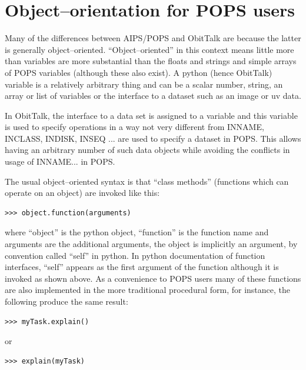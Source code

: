 \documentclass[11pt]{report}
\begin{document}
\section {Object--orientation for POPS users}
Many of the differences between AIPS/POPS and ObitTalk are because the
latter is generally object--oriented.
``Object--oriented'' in this context means little more than variables
are more substantial than the floats and strings and simple arrays of
POPS variables (although these also exist).
A python (hence ObitTalk) variable is a relatively arbitrary thing and
can be a scalar number, string, an array or list of variables or the
interface to a dataset such as an image or uv data.

In ObitTalk, the interface to a  data set is assigned to a variable and
this variable is used to specify operations in a way not very
different from INNAME, INCLASS, INDISK, INSEQ ... are used to specify
a dataset in POPS.
This allows having an arbitrary number of such data objects while
avoiding the conflicts in usage of INNAME... in POPS.

The usual object--oriented syntax is that ``class methods'' (functions
which can operate on an object)  are invoked like this:
\begin{verbatim}
>>> object.function(arguments)
\end{verbatim}
where ``object'' is the python object, ``function'' is the function
name and arguments are the additional arguments, the object is
implicitly an argument, by convention called ``self'' in python.
In python documentation of function interfaces, ``self'' appears as the
first argument of the function although it is invoked as shown above.
As a convenience to POPS users many of these functions are also
implemented in the more traditional procedural form, for instance, the
following produce the same result:
\begin{verbatim}
>>> myTask.explain()
\end{verbatim}
or
\begin{verbatim}
>>> explain(myTask)
\end{verbatim}
\end{document}
